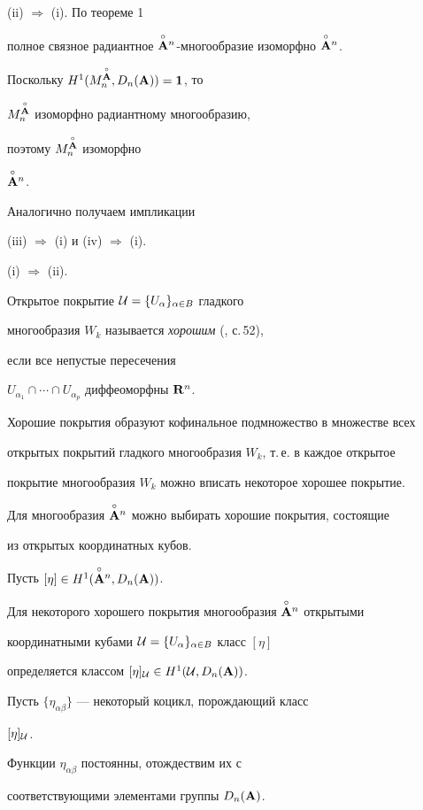 \begin{pf}


(ii) $\Rightarrow$ (i). По теореме 1


полное связное радиантное $\overset{\circ}{\bold A}{}^n$-многообразие изоморфно $\overset{\circ}{\bold A}{}^n$.


Поскольку $H^1 (M^{\overset{\circ}{\bold A}{}}_n,D_n({\bold A}))={\bold 1}$, то


$M^{\overset{\circ}{\bold A}{}}_n$ изоморфно радиантному многообразию,


поэтому  $M^{\overset{\circ}{\bold A}{}}_n$ изоморфно


$\overset{\circ}{\bold A}{}^n$.





Аналогично получаем импликации


(iii) $\Rightarrow$ (i) и (iv) $\Rightarrow$ (i).





(i) $\Rightarrow$ (ii).


Открытое покрытие ${\cal U}=\{U_\alpha\}_{\alpha\in B}$ гладкого


многообразия $W_k$ называется {\it хорошим} (\cite{Bott}, с.\,52),


\label{fine} если все непустые пересечения


$U_{\alpha_1}\cap\dotsb\cap U_{\alpha_p}$ диффеоморфны ${\bold R}^n$.


Хорошие покрытия образуют кофинальное подмножество в множестве всех


открытых покрытий гладкого многообразия $W_k$, т.\,е. в каждое открытое


покрытие многообразия $W_k$ можно вписать некоторое хорошее покрытие.


Для многообразия $\overset{\circ}{\bold A}{}^n$ можно выбирать хорошие покрытия, состоящие


из открытых координатных кубов.


Пусть $[\eta]\in H^1(\overset{\circ}{\bold A}{}^n,D_n({\bold A}))$.


Для некоторого хорошего покрытия многообразия $\overset{\circ}{\bold A}{}^n$ открытыми


координатными кубами ${\cal U}=\{U_\alpha\}_{\alpha\in B}$ класс $[\eta]$


определяется классом $[\eta]_{\cal U}\in H^1({\cal U},D_n({\bold A}))$.


Пусть $\{\eta_{\alpha\beta}\}$ --- некоторый коцикл, порождающий класс


$[\eta]_{\cal U}$.


Функции $\eta_{\alpha\beta}$ постоянны, отождествим их с


соответствующими элементами группы $D_n({\bold A})$.



\end{pf}
